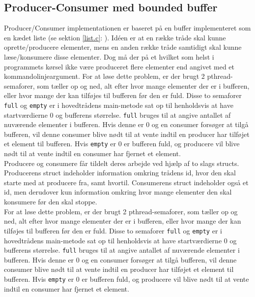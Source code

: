\subsection{Producer-Consumer med bounded buffer}
Producer/Consumer implementationen er baseret på en buffer implementeret som en kædet liste (se sektion \ref{list.c}: ). Idéen er at en række tråde skal kunne oprette/producere elementer, mens en anden række tråde samtidigt skal kunne læse/konsumere disse elementer. Dog må der på et hvilket som helst i programmets kørsel ikke være produceret flere elementer end angivet med et kommandolinjeargument. For at løse dette problem, er der brugt 2 pthread-semaforer, som tæller op og ned, alt efter hvor mange elementer der er i bufferen, eller hvor mange der kan tilføjes til bufferen før den er fuld. Disse to semaforer \texttt{full} og \texttt{empty} er i hovedtrådens main-metode sat op til henholdsvis at have startværdierne 0 og bufferens størrelse. \texttt{full} bruges til at angive antallet af nuværende elementer i bufferen. Hvis denne er 0 og en consumer forsøger at tilgå bufferen, vil denne consumer blive nødt til at vente indtil en producer har tilføjet et element til bufferen. Hvis \texttt{empty} er 0 er bufferen fuld, og producere vil blive nødt til at vente indtil en consumer har fjernet et element.\\

Producere og consumere får tildelt deres arbejde ved hjælp af to slags structs. Producerens struct indeholder information omkring trådens id, hvor den skal starte med at producere fra, samt hvortil. Consumerens struct indeholder også et id, men derudover kun information omkring hvor mange elementer den skal konsumere før den skal stoppe.\\

For at løse dette problem, er der brugt 2 pthread-semaforer, som tæller op og ned, alt efter hvor mange elementer der er i bufferen, eller hvor mange der kan tilføjes til bufferen før den er fuld. Disse to semaforer \texttt{full} og \texttt{empty} er i hovedtrådens main-metode sat op til henholdsvis at have startværdierne 0 og bufferens størrelse. \texttt{full} bruges til at angive antallet af nuværende elementer i bufferen. Hvis denne er 0 og en consumer forsøger at tilgå bufferen, vil denne consumer blive nødt til at vente indtil en producer har tilføjet et element til bufferen. Hvis \texttt{empty} er 0 er bufferen fuld, og producere vil blive nødt til at vente indtil en consumer har fjernet et element.\\

